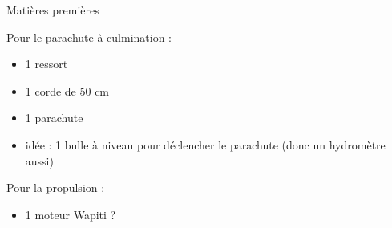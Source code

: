 \documentclass{beamer}
\begin{document}
	\begin{frame}{Matières premières}

		\fontsize{6}{12}\selectfont
		

                Pour le parachute à culmination :
                \begin{itemize}

                        \item 1 ressort
                        \item 1 corde de 50 cm
                        \item 1 parachute
                        \item idée : 1 bulle à niveau pour déclencher le parachute (donc un hydromètre aussi)
                \end{itemize}



                Pour la propulsion :

                \begin{itemize}

                        \item 1 moteur Wapiti ?
                \end{itemize}

	\end{frame}
	
\end{document}
